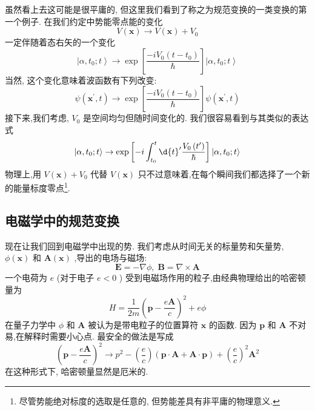 \documentclass[lang=cn,newtx,10pt,scheme=chinese,thmcnt=section]{elegantbook}
\begin{document}
虽然看上去这可能是很平庸的, 但这里我们看到了称之为规范变换的一类变换的第一个例子. 在我们约定中势能零点能的变化
\begin{equation}
	V\left( \mathbf{x}\right) \rightarrow V\left( \mathbf{x}\right) + {V}_{0}
\end{equation}
一定伴随着态右矢的一个变化
\begin{equation}
	\left| {\alpha ,{t}_{0};t}\right\rangle \rightarrow \exp \left\lbrack \frac{-i{V}_{0}\left( {t - {t}_{0}}\right) }{\hbar }\right\rbrack \left| {\alpha ,{t}_{0};t}\right\rangle
\end{equation}
当然, 这个变化意味着波函数有下列改变:
\begin{equation}
	\psi \left( {{\mathbf{x}}^{\prime }, t}\right) \rightarrow \exp \left\lbrack \frac{-i{V}_{0}\left( {t - {t}_{0}}\right) }{\hbar }\right\rbrack \psi \left( {{\mathbf{x}}^{\prime }, t}\right)
\end{equation}
接下来,我们考虑, ${V}_{0}$ 是空间均匀但随时间变化的. 我们很容易看到与其类似的表达式
\begin{equation}
	\left| {\alpha ,{t}_{0};t}\right\rangle \rightarrow \exp \left\lbrack {-i\int_{{t}_{0}}^{t}\d{t}^{\prime }\frac{{V}_{0}\left( {t}^{\prime }\right) }{\hbar }}\right\rbrack \left| {\alpha ,{t}_{0};t}\right\rangle
\end{equation}
物理上,用 $V\left( \mathbf{x}\right) + {V}_{0}$ 代替 $V\left( \mathbf{x}\right)$ 只不过意味着,在每个瞬间我们都选择了一个新的能量标度零点\footnote{尽管势能绝对标度的选取是任意的, 但势能差具有非平庸的物理意义.}.
\subsection*{电磁学中的规范变换}
现在让我们回到电磁学中出现的势. 我们考虑从时间无关的标量势和矢量势, $\phi \left( \mathbf{x}\right)$ 和 $\mathbf{A}\left( \mathbf{x}\right)$ ,导出的电场与磁场:
\begin{equation}
	\mathbf{E} = - \nabla \phi ,\;\mathbf{B} = \nabla \times \mathbf{A}
\end{equation}
一个电荷为 $e$ (对于电子 $e < 0$ ) 受到电磁场作用的粒子,由经典物理给出的哈密顿量为
\begin{equation}
	H = \frac{1}{2m}{\left( \mathbf{p} - \frac{e\mathbf{A}}{c}\right) }^{2} + {e\phi }
\end{equation}
在量子力学中 $\phi$ 和 $\mathbf{A}$ 被认为是带电粒子的位置算符 $\mathbf{x}$ 的函数. 因为 $\mathbf{p}$ 和 $\mathbf{A}$ 不对易,在解释时需要小心点. 最安全的做法是写成
\begin{equation}
	{\left( \mathbf{p} - \frac{e\mathbf{A}}{c}\right) }^{2} \rightarrow {p}^{2} - \left( \frac{e}{c}\right) \left( {\mathbf{p} \cdot \mathbf{A} + \mathbf{A} \cdot \mathbf{p}}\right) + {\left( \frac{e}{c}\right) }^{2}{\mathbf{A}}^{2}
\end{equation}
在这种形式下, 哈密顿量显然是厄米的.
\end{document}
